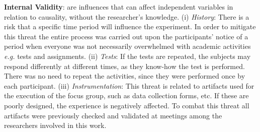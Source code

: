 \documentclass[a4paper,twoside,anonymous]{article}
\begin{document}

\textbf{Internal Validity}: are influences that can affect independent variables in relation to causality, without the researcher's knowledge.
(i) \textit{History}: There is a risk that a specific time period will influence the experiment. In order to mitigate this threat
the entire process was carried out upon the participants' notice of a period when everyone was not necessarily overwhelmed with academic activities \textit{e.g.} tests and assignments.
(ii) \textit{Tests}: If the tests are repeated, the subjects may respond differently at different times, as they know-how the test is performed. 
There was no need to repeat the activities, since they were performed once by each participant.
(iii) \textit{Instrumentation}: This threat is related to artifacts used for the execution of the focus group, such as data collection forms, etc. If these are poorly designed, the experience is negatively affected. To combat this threat all artifacts were previously checked and validated at meetings among the researchers involved in this work.
\end{document}
